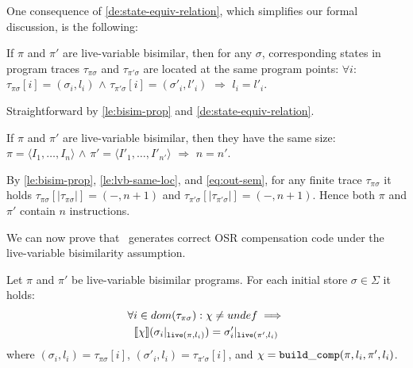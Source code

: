 \noindent One consequence of \ref{de:state-equiv-relation}, which simplifies our formal discussion, is the following:

\begin{lemma}
\label{le:lvb-same-loc}
If $\pi$ and $\pi'$ are live-variable bisimilar, then for any $\sigma$, corresponding states in program traces $\tau_{\pi\sigma}$ and $\tau_{\pi'\sigma}$ are located at the same program points: $\forall i:$ $\tau_{\pi\sigma}[i]=(\sigma_i, l_i)$ $\wedge$ $\tau_{\pi'\sigma}[i]=(\sigma'_i, l'_i)$ $\Longrightarrow$ $l_i=l'_i$.
\end{lemma}
\begin{myproof}
Straightforward by \ref{le:bisim-prop} and \ref{de:state-equiv-relation}.
\end{myproof}

\begin{corollary}
If $\pi$ and $\pi'$ are live-variable bisimilar, then they have the same size: $\pi=\langle I_1,\ldots,I_n\rangle$ $\wedge$ $\pi'=\langle I'_1,\ldots,I'_{n'}\rangle$ $\Longrightarrow$ $n=n'$. 
\end{corollary}
\begin{myproof}
By \ref{le:bisim-prop}, \ref{le:lvb-same-loc}, and \eqref{eq:out-sem}, for any finite trace $\tau_{\pi\sigma}$ it holds $\tau_{\pi\sigma}[|\tau_{\pi\sigma}|]=(-,n+1)$ and $\tau_{\pi'\sigma}[|\tau_{\pi'\sigma}|]=(-,n+1)$. Hence both $\pi$ and $\pi'$ contain $n$ instructions.
\end{myproof}

\noindent We can now prove that \buildcomp\ generates correct OSR compensation code under the live-variable bisimilarity assumption. 

\begin{lemma}
\label{le:build-comp-corr}
Let $\pi$ and $\pi'$ be live-variable bisimilar programs. For each initial store $\sigma\in \Sigma$ it holds:
\begin{gather*}
\forall i\in dom(\tau_{\pi\sigma}): \chi\neq undef \implies \\
\mysem{\chi}(\sigma_i\vert_{\live(\pi,l_i)}) = \sigma'_i\vert_{\live(\pi',l_i)}
\end{gather*}
where $(\sigma_i,l_i)=\tau_{\pi\sigma}[i]$, $(\sigma'_i,l_i)=\tau_{\pi'\sigma}[i]$, and $\chi={\tt build\_comp}(\pi,l_i,\pi',l_i)$.
\end{lemma}

